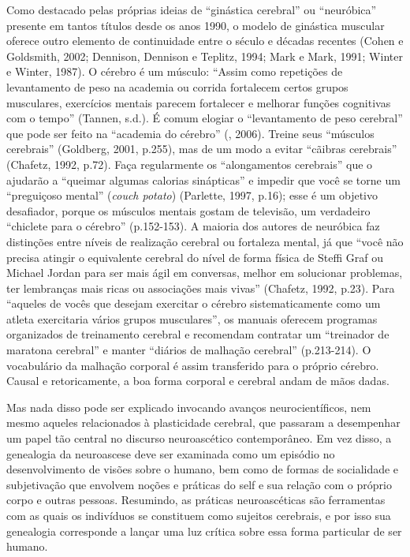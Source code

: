 Como destacado pelas próprias ideias de ``ginástica cerebral'' ou
``neuróbica'' presente em tantos títulos desde os anos 1990, o modelo de
ginástica muscular oferece outro elemento de continuidade entre o século
 e décadas recentes (Cohen e Goldsmith, 2002; Dennison, Dennison e
Teplitz, 1994; Mark e Mark, 1991; Winter e Winter, 1987). O cérebro é um
músculo: ``Assim como repetições de levantamento de peso na academia ou
corrida fortalecem certos grupos musculares, exercícios mentais parecem
fortalecer e melhorar funções cognitivas com o tempo'' (Tannen, s.d.). É
comum elogiar o ``levantamento de peso cerebral'' que pode ser feito na
``academia do cérebro'' (, 2006). Treine seus ``músculos cerebrais''
(Goldberg, 2001, p.255), mas de um modo a evitar ``cãibras cerebrais''
(Chafetz, 1992, p.72). Faça regularmente os ``alongamentos cerebrais''
que o ajudarão a ``queimar algumas calorias sinápticas'' e impedir que
você se torne um ``preguiçoso mental'' (\emph{couch potato}) (Parlette,
1997, p.16); esse é um objetivo desafiador, porque os músculos mentais
gostam de televisão, um verdadeiro ``chiclete para o cérebro''
(p.152-153). A maioria dos autores de neuróbica faz distinções entre
níveis de realização cerebral ou fortaleza mental, já que ``você não
precisa atingir o equivalente cerebral do nível de forma física de
Steffi Graf ou Michael Jordan para ser mais ágil em conversas, melhor em
solucionar problemas, ter lembranças mais ricas ou associações mais
vivas'' (Chafetz, 1992, p.23). Para ``aqueles de vocês que desejam
exercitar o cérebro sistematicamente como um atleta exercitaria vários
grupos musculares'', os manuais oferecem programas organizados de
treinamento cerebral e recomendam contratar um ``treinador de maratona
cerebral'' e manter ``diários de malhação cerebral'' (p.213-214). O
vocabulário da malhação corporal é assim transferido para o próprio
cérebro. Causal e retoricamente, a boa forma corporal e cerebral andam
de mãos dadas.

Mas nada disso pode ser explicado invocando avanços neurocientíficos,
nem mesmo aqueles relacionados à plasticidade cerebral, que passaram a
desempenhar um papel tão central no discurso neuroascético
contemporâneo. Em vez disso, a genealogia da neuroascese deve ser
examinada como um episódio no desenvolvimento de visões sobre o humano,
bem como de formas de socialidade e subjetivação que envolvem noções e
práticas do self e sua relação com o próprio corpo e outras pessoas.
Resumindo, as práticas neuroascéticas são ferramentas com as quais os
indivíduos se constituem como sujeitos cerebrais, e por isso sua
genealogia corresponde a lançar uma luz crítica sobre essa forma
particular de ser humano.

